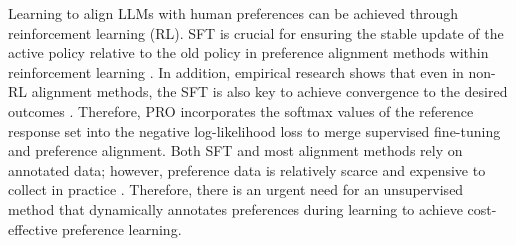Learning to align LLMs with human preferences can be achieved through reinforcement learning (RL).
SFT is crucial for ensuring the stable update of the active policy relative to the old policy in preference alignment methods within reinforcement learning \cite{schulman2017proximal}.
In addition, empirical research shows that even in non-RL alignment methods, the SFT is also key to achieve convergence to the desired outcomes \cite{rafailov2024direct, tunstall2023zephyr}.
Therefore, PRO \cite{song2024preference} incorporates the softmax values of the reference response set into the negative log-likelihood loss to merge supervised fine-tuning and preference alignment.
Both SFT and most alignment methods \cite{rafailov2024direct,christiano2017deep,song2024preference,zhao2023slic} rely on annotated data; however, preference data is relatively scarce and expensive to collect in practice \cite{casper2023open}. Therefore, there is an urgent need for an unsupervised method that dynamically annotates preferences during learning to achieve cost-effective preference learning.


